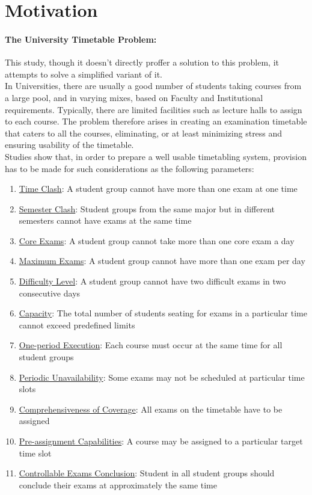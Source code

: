 \documentclass[a4paper,openany]{book}
\begin{document}
		\section{Motivation}
			\paragraph{The University Timetable Problem:}
			This study, though it doesn't directly proffer a solution to this problem, it attempts to solve a simplified variant of it.
			\\In Universities, there are usually a good number of students taking courses from a large pool, and in varying mixes, based on Faculty and Institutional requirements. Typically, there are limited facilities such as lecture halls to assign to each course. The problem therefore arises in creating an examination timetable that caters to all the courses, eliminating, or at least minimizing stress and ensuring usability of the timetable.
			\\Studies show that, in order to prepare a well usable timetabling system, provision has to be made for such considerations as the following parameters:
			\begin{enumerate}
				\item \underline{Time Clash}: A student group cannot have more than one exam at one time
				\item \underline{Semester Clash}: Student groups from the same major but in different semesters cannot have exams at the same time
				\item \underline{Core Exams}: A student group cannot take more than one core exam a day
				\item \underline{Maximum Exams}: A student group cannot have more than one exam per day
				\item \underline{Difficulty Level}: A student group cannot have two difficult exams in two consecutive days
				\item \underline{Capacity}: The total number of students seating for exams in a particular time cannot exceed predefined limits
				\item \underline{One-period Execution}: Each course must occur at the same time for all student groups
				\item \underline{Periodic Unavailability}: Some exams may not be scheduled at particular time slots
				\item \underline{Comprehensiveness of Coverage}: All exams on the timetable have to be assigned
				\item \underline{Pre-assignment Capabilities}: A course may be assigned to a particular target time slot
				\item \underline{Controllable Exams Conclusion}: Student in all student groups should conclude their exams at approximately the same time
			\end{enumerate}
\end{document}
